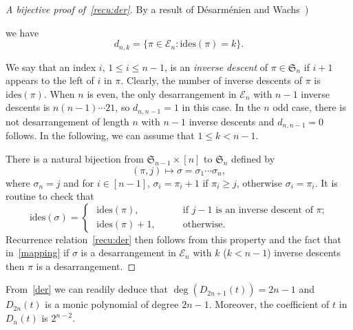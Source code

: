 \documentclass[12pt]{amsart}
\numberwithin{equation}{section}
\theoremstyle{plain}
\theoremstyle{definition}
\def\S{\mathfrak{S}}
\def\E{\mathcal{E}}
\def\ides{\mathrm{ides}}
\begin{document}
 \begin{proof}[A bijective proof of~\eqref{recu:der}] 
 By a result of D\'esarm\'enien and Wachs~\cite[Corollary~3.3]{dw}) 





we have 
 $$
 d_{n,k}=\{\pi\in\E_n:\ides(\pi)=k\}.
 $$

 
We say that an index $i$, $1\leq i\leq n-1$, is an {\em inverse descent} of $\pi\in\S_n$ if $i+1$ appears to the left of $i$ in $\pi$. Clearly, the number of inverse descents of $\pi$ is $\ides(\pi)$. When $n$ is even, the only desarrangement in $\E_n$ with $n-1$ inverse descents is $n(n-1)\cdots 21$, so $d_{n,n-1}=1$ in this case. In the $n$ odd case, there is not desarrangement of length $n$ with $n-1$ inverse descents and $d_{n,n-1}=0$ follows. In the following, we can assume that $1\leq k<n-1$.


There is a natural bijection  from $\S_{n-1}\times[n]$ to $\S_n$ defined by 
\begin{equation}\label{mapping}
(\pi,j)\mapsto\sigma=\sigma_1\cdots\sigma_n, 
\end{equation}
where $\sigma_n=j$ and for $ i\in[n-1]$, $\sigma_i=\pi_i+1$ if $\pi_i\geq j$, otherwise $\sigma_i=\pi_i$.
It is routine to check that 
$$
\ides(\sigma)=
\begin{cases}
\,\,\ides(\pi),\qquad&\text{if $j-1$ is an inverse descent of $\pi$;}\\
\,\,\ides(\pi)+1,\qquad&\text{otherwise}.
\end{cases}
$$
Recurrence relation~\eqref{recu:der} then follows from this property and the fact that in~\eqref{mapping} if $\sigma$ is a desarrangement in $\E_n$ with $k$ ($k<n-1$) inverse descents then $\pi$ is a desarrangement.
 \end{proof}
 
 From~\eqref{der} we can readily deduce that $\deg(D_{2n+1}(t))=2n-1$ and $D_{2n}(t)$ is a monic polynomial of degree $2n-1$. Moreover, the coefficient of $t$ in $D_n(t)$ is $2^{n-2}$.
  
\end{document}
